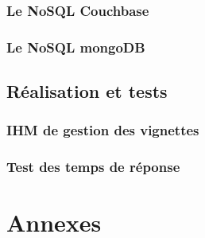                 \section{Le \textsf{NoSQL Couchbase}}\label{couchbase}
                

                \section{Le \textsf{NoSQL mongoDB}}\label{mongodb}
                



      \chapter{Réalisation et tests}

                \section{IHM de gestion des vignettes}

                \section{Test des temps de réponse}

      

\printindex

\nocite{cassandra2}
\nocite{cassandra}
\nocite{NoSQLCmp}
\nocite{NoSQLeurope}
\nocite{NoSQLvsSQL}



\part{Annexes}
\appendix



%
